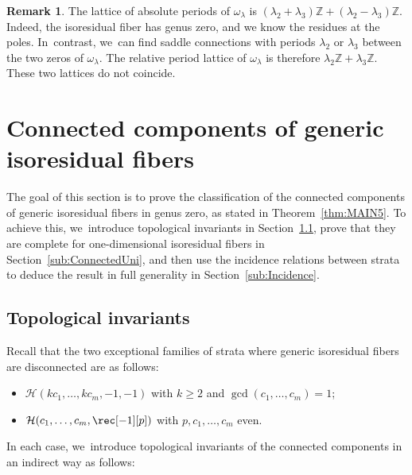 \documentclass[JEP,XML,SOM,Unicode,NoFloatCountersInSection,published]{cedram}
\theoremstyle{definition}
\newtheorem{rmk}[thm]{Remark}
\begin{document}
\begin{rmk}
The lattice of absolute periods of $\omega_{\lambda}$ is $(\lambda_{2}+\lambda_{3})\mathbb{Z}+(\lambda_{2}-\lambda_{3})\mathbb{Z}$. Indeed, the isoresidual fiber has genus zero, and we know the residues at the poles. In~contrast, we~can find saddle connections with periods $\lambda_{2}$ or $\lambda_{3}$ between the two zeros of $\omega_{\lambda}$. The relative period lattice of $\omega_{\lambda}$ is therefore $\lambda_{2}\mathbb{Z}+\lambda_{3}\mathbb{Z}$. These two lattices do not coincide.
\end{rmk}

\section{Connected components of generic isoresidual fibers}\label{sec:Connected}

The goal of this section is to prove the classification of the connected components of generic isoresidual fibers in genus zero, as stated in Theorem~\ref{thm:MAIN5}. To achieve this, we~introduce topological invariants in Section~\ref{sub:ConnectedInvariant}, prove that they are complete for one-dimensional isoresidual fibers in Section~\ref{sub:ConnectedUni}, and then use the incidence relations between strata to deduce the result in full generality in Section~\ref{sub:Incidence}.

\subsection{Topological invariants}\label{sub:ConnectedInvariant}

Recall that the two exceptional families of strata where generic isoresidual fibers are disconnected are as follows:
\begin{itemize}
\item $\mathcal{H}(kc_{1},\dots,kc_{m},-1,-1)$ with $k \geq 2$ and $\gcd(c_{1},\dots,c_{m})=1$;
\item $\mathcal{H}(c_{1},\dots,c_{m},\rec[-1][p])$ with $p,c_{1},\dots,c_{m}$ even.
\end{itemize}
In each case, we~introduce topological invariants of the connected components in an indirect way as follows:
\end{document}
